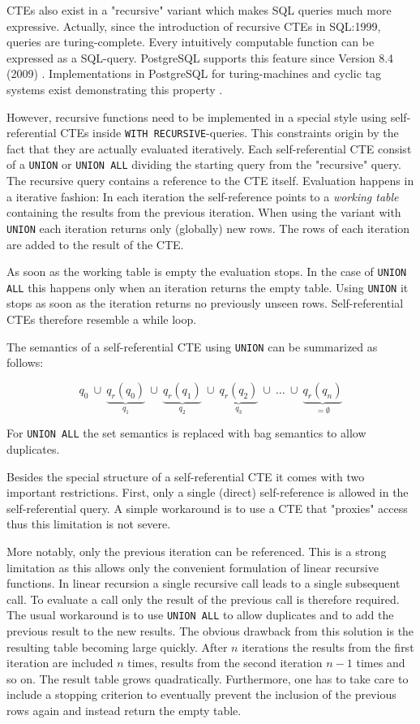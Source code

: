 CTEs also exist in a "recursive" variant which makes SQL queries much more expressive. Actually, since the introduction of recursive CTEs in SQL:1999, queries are turing-complete. Every intuitively computable function can be expressed as a SQL-query. PostgreSQL supports this feature since Version 8.4 (2009) \cite[p. 2811]{psql}. Implementations in PostgreSQL for turing-machines and cyclic tag systems exist demonstrating this property \cite{psqlWikiCTS, psqlWikiTM}.

However, recursive functions need to be implemented in a special style using self-referential CTEs inside \texttt{WITH RECURSIVE}-queries. This constraints origin by the fact that they are actually evaluated iteratively. Each self-referential CTE consist of a \texttt{UNION} or \texttt{UNION ALL} dividing the starting query from the "recursive" query. The recursive query contains a reference to the CTE itself. Evaluation happens in a iterative fashion: In each iteration the self-reference points to a \textit{working table} containing the results from the previous iteration. When using the variant with \texttt{UNION} each iteration returns only (globally) new rows. The rows of each iteration are added to the result of the CTE.

As soon as the working table is empty the evaluation stops. In the case of \texttt{UNION ALL} this happens only when an iteration returns the empty table. Using \texttt{UNION} it stops as soon as the iteration returns no previously unseen rows. Self-referential CTEs therefore resemble a while loop.

The semantics of a self-referential CTE using \texttt{UNION} can be summarized as follows:

$$
q_0 ~\cup ~\underbrace{q_r(q_0)}_{q_1} ~\cup~ \underbrace{q_r(q_1)}_{q_2}~ \cup~\underbrace{q_r(q_2)}_{q_3}~ \cup ~\hdots ~ \cup ~ \underbrace{q_r(q_n)}_{= \emptyset}
$$

For \texttt{UNION ALL} the set semantics is replaced with bag semantics to allow duplicates.

Besides the special structure of a self-referential CTE it comes with two important restrictions. First, only a single (direct) self-reference is allowed in the self-referential query. A simple workaround is to use a CTE that "proxies" access thus this limitation is not severe.

More notably, only the previous iteration can be referenced. This is a strong limitation as this allows only the convenient formulation of linear recursive functions. In linear recursion a single recursive call leads to a single subsequent call. To evaluate a call only the result of the previous call is therefore required. The usual workaround is to use \texttt{UNION ALL} to allow duplicates and to add the previous result to the new results. The obvious drawback from this solution is the resulting table becoming large quickly. After $n$ iterations the results from the first iteration are included $n$ times, results from the second iteration $n-1$ times and so on. The result table grows quadratically. Furthermore, one has to take care to include a stopping criterion to eventually prevent the inclusion of the previous rows again and instead return the empty table.



